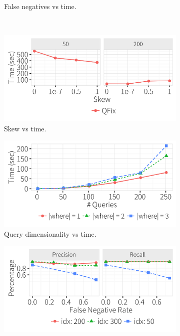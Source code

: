 \begin{figure}[ht]
\begin{subfigure}[t]{.33\textwidth}
      \vspace*{-.25in}
      \caption{False negatives vs time.}
      \label{f:falsenegative_time} 
    \end{subfigure} 
    \\
    \hspace*{-.1in}
    \vspace*{.2in}
    \begin{subfigure}[t]{.33\textwidth}
      \includegraphics[width = .99\columnwidth]{figures/skew_time}
      \vspace*{-.25in}
      \caption{Skew vs time.}
      \label{f:skew_time} 
    \end{subfigure}
    \begin{subfigure}[t]{.33\textwidth}
      \includegraphics[width = .99\columnwidth]{figures/where_time}
      \vspace*{-.25in}
      \caption{Query dimensionality vs time.}
      \label{f:where_time} 
    \end{subfigure}
    \begin{subfigure}[t]{.33\textwidth}
      \includegraphics[width = .99\columnwidth]{figures/noise_fn_acc}

\end{subfigure}
\end{figure}
